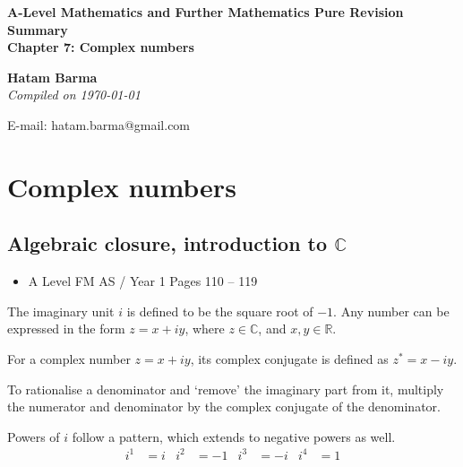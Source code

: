 \documentclass[11pt, a4paper]{article}
\begin{document}
\begin{titlepage}
   \begin{center}
       \vspace*{2.5cm}
	\huge
       \textbf{A-Level Mathematics and Further Mathematics Pure Revision Summary} \\
	\vspace{1cm}
	\Large
       \textbf{Chapter 7: Complex numbers}
            
       \vspace{1.5cm}
	\LARGE
       \textbf{Hatam Barma} \\
	\vspace{0.75cm}
       \normalsize
       \emph{Compiled on \Datea\today} \\

       \vfill
        

	E-mail: hatam.barma@gmail.com
   \end{center}
\end{titlepage}


\tableofcontents

\clearpage
\section{Complex numbers}
\vspace{0.5cm}

\subsection{Algebraic closure, introduction to $\mathbb{C}$}
\begin{itemize}
\item A Level FM AS / Year 1 \hspace{1cm} Pages 110 -- 119
\end{itemize} \par
The imaginary unit $i$ is defined to be the square root of $-1$. Any number can be expressed in the form $z=x+iy$, where $z\in\mathbb{C}$, and $x,y\in\mathbb{R}$. \newline \par
For a complex number $z=x+iy$, its complex conjugate is defined as $z^{*}=x-iy$. \newline \par
To rationalise a denominator and `remove' the imaginary part from it, multiply the numerator and denominator by the complex conjugate of the denominator. \newline \par
Powers of $i$ follow a pattern, which extends to negative powers as well.
\begin{align*}
i^{1}&=i & i^{2}&=-1 & i^{3}&=-i & i^{4}&=1
\end{align*}
\vspace{0.25cm}
\end{document}
